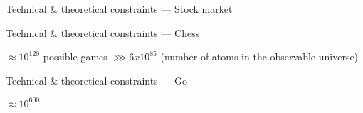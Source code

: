 \begin{frame}{Technical \& theoretical constraints --- Stock market}
\end{frame}

\begin{frame}{Technical \& theoretical constraints --- Chess}
  \pause
  \begin{center}
    $\approx 10^{120}$ possible games $\ggg 6 x 10^{85}$
    \newline
    (number of atoms in the observable universe)
  \end{center}
\end{frame}

\begin{frame}{Technical \& theoretical constraints --- Go}
  \begin{center}
    \huge{$\approx 10^{600}$}
  \end{center}
\end{frame}
